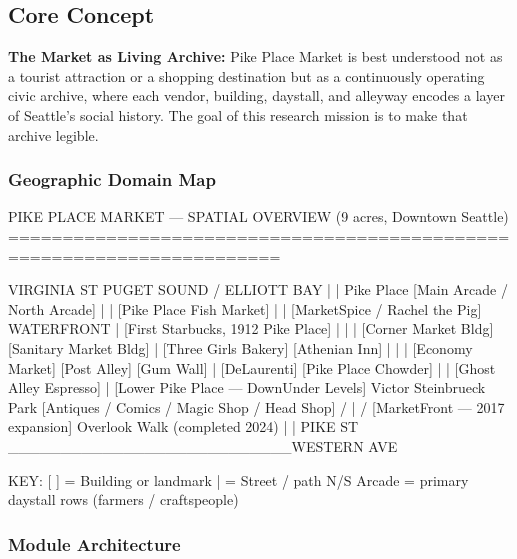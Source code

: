 \documentclass[11pt,letterpaper]{article}
\begin{document}
\subsection{Core Concept}

\textbf{The Market as Living Archive:} Pike Place Market is best understood not as a tourist attraction or a shopping destination but as a continuously operating civic archive, where each vendor, building, daystall, and alleyway encodes a layer of Seattle's social history. The goal of this research mission is to make that archive legible.

\subsubsection{Geographic Domain Map}

\begin{asciibox}
PIKE PLACE MARKET --- SPATIAL OVERVIEW (9 acres, Downtown Seattle)
=======================================================================

  VIRGINIA ST                              PUGET SOUND / ELLIOTT BAY
      |                                             |
  Pike Place  [Main Arcade / North Arcade]          |
      |   [Pike Place Fish Market]                  |
      |   [MarketSpice / Rachel the Pig]        WATERFRONT
      |   [First Starbucks, 1912 Pike Place]        |
      |                                             |
  [Corner Market Bldg]  [Sanitary Market Bldg]     |
  [Three Girls Bakery]  [Athenian Inn]              |
      |                                             |
  [Economy Market]   [Post Alley]    [Gum Wall]     |
  [DeLaurenti]       [Pike Place Chowder]           |
      |              [Ghost Alley Espresso]         |
  [Lower Pike Place --- DownUnder Levels]      Victor Steinbrueck Park
  [Antiques / Comics / Magic Shop / Head Shop]     /
      |                                           /
  [MarketFront --- 2017 expansion]   Overlook Walk (completed 2024)
      |                                  |
  PIKE ST ___________________________WESTERN AVE

  KEY:  [  ] = Building or landmark    |  = Street / path
        N/S Arcade = primary daystall rows (farmers / craftspeople)
\end{asciibox}

\subsubsection{Module Architecture}
\end{document}
